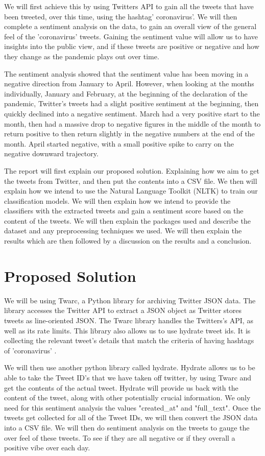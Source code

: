 \documentclass[a4paper,10pt]{article}
\begin{document}
We will first achieve this by using Twitters API to gain all the tweets that have been tweeted, over this time, using the hashtag' coronavirus'. We will then complete a sentiment analysis on the data, to gain an overall view of the general feel of the 'coronavirus' tweets. Gaining the sentiment value will allow us to have insights into the public view, and if these tweets are positive or negative and how they change as the pandemic plays out over time. 

The sentiment analysis showed that the sentiment value has been moving in a negative direction from January to April. However, when looking at the months individually, January and February, at the beginning of the declaration of the pandemic, Twitter's tweets had a slight positive sentiment at the beginning, then quickly declined into a negative sentiment. March had a very positive start to the month, then had a massive drop to negative figures in the middle of the month to return positive to then return slightly in the negative numbers at the end of the month. April started negative, with a small positive spike to carry on the negative downward trajectory.

The report will first explain our proposed solution. Explaining how we aim to get the tweets from Twitter, and then put the contents into a CSV file. We then will explain how we intend to use the Natural Language Toolkit (NLTK) to train our classification models. We will then explain how we intend to provide the classifiers with the extracted tweets and gain a sentiment score based on the content of the tweets. We will then explain the packages used and describe the dataset and any preprocessing techniques we used. We will then explain the results which are then followed by a discussion on the results and a conclusion.

\section{Proposed Solution}
We will be using Twarc, a Python library for archiving Twitter JSON data. The library accesses the Twitter API to extract a JSON object as Twitter stores tweets as line-oriented JSON. The Twarc library handles the Twitters's API, as well as its rate limits. This library also allows us to use hydrate tweet ids. It is collecting the relevant tweet's details that match the criteria of having hashtags of 'coronavirus' \cite{twarc}.

We will then use another python library called hydrate. Hydrate allows us to be able to take the Tweet ID's that we have taken off twitter, by using Twarc and get the contents of the actual tweet. Hydrate will provide us back with the content of the tweet, along with other potentially crucial information. We only need for this sentiment analysis the values "created\_at" and "full\_text". Once the tweets get collected for all of the Tweet IDs, we will then convert the JSON data into a CSV file. We will then do sentiment analysis on the tweets to gauge the over feel of these tweets. To see if they are all negative or if they overall a positive vibe over each day.
\end{document}
